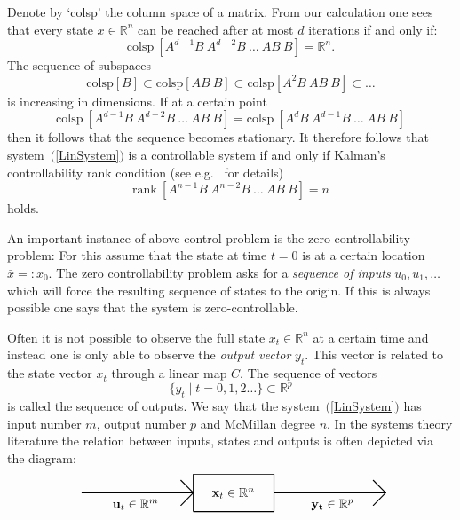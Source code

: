\documentclass[12pt]{report}
\numberwithin{equation}{chapter}
\numberwithin{figure}{chapter}
\newcommand{\R}{\mathbb{R}}
\newcommand{\eqr}[1]{~\mbox{$(${\rm \ref{#1}}$)$}}
\begin{document}
Denote by `colsp' the column space of a matrix. From our
calculation one sees that every state $x\in\R^n$ can be reached
after at most $d$ iterations if and only if:
$$
\mathrm{colsp}\ \left[ A^{d-1}B\ A^{d-2}B\ \ldots \ AB\ 
  B\right]= \R^n.
$$
The sequence of subspaces 
$$
\mathrm{colsp}\left[ B\right]\subset 
\mathrm{colsp}\left[AB\  B\right]\subset
\mathrm{colsp}\left[A^2B\ AB\ B\right]\subset \ldots
$$
is increasing in dimensions. If at a certain point 
$$
\mathrm{colsp}\ \left[ A^{d-1}B\ A^{d-2}B\ \ldots \ AB\ B\right]
=\mathrm{colsp}\ \left[ A^{d}B\ A^{d-1}B\ \ldots \ AB\ B\right]
$$
then it follows that the sequence becomes stationary. 
It therefore follows that system\eqr{LinSystem} is a controllable
system if and only if Kalman's controllability rank
condition (see e.g.~\cite{so90} for details) 
$$
\mathrm{rank}\ \left[ A^{n-1}B\ A^{n-2}B\ \ldots \ AB\ B\right]=
n
$$
holds.


An important instance of above control problem is the zero
controllability problem: For this assume that the state at time
$t=0$ is at a certain location $\bar{x}=:x_0$. The zero
controllability problem asks for a {\em sequence of inputs}
$u_0,u_1,\ldots$  which will force the
resulting sequence of states to the origin. If this is always
possible one says that the system is zero-controllable.

Often it is not possible to observe the full state $x_t\in\R^n$
at a certain time and instead one is only able to observe the
{\em output vector}  $y_t$. This vector
is related to the state vector $x_t$ through a linear map $C$.
The sequence of vectors
$$
\{y_t\mid t=0,1,2\ldots\}\subset \R^p
$$
is called the sequence of outputs. We say that the
system\eqr{LinSystem} has input number $m$, output number $p$ and
McMillan degree \index{McMillan degree} $n$. In the systems
theory literature the relation between inputs, states and outputs
is often depicted via the diagram:
$$
\begin{picture}(240,30)
\thicklines
  \put(  0,15){\line(1, 0){90}}   
 \put( 80,25){\line(1,-1){10}}   
 \put( 80, 5){\line(1, 1){10}}   
 \put( 25, 3){${\mathbf u_t}\in{\mathbb R}^m$}

 \put( 90, 0){\line(1,0){65}} 
 \put( 90,30){\line(1,0){65}}
 \put( 90, 0){\line(0,1){30}}  
 \put(155, 0){\line(0,1){30}}
 \put(105,12){${\mathbf x_t}\in{\mathbb R}^n$}

 \put(155,15){\line(1,0){90}}
 \put(235,25){\line(1,-1){10}}
 \put(235, 5){\line(1, 1){10}}
 \put(185, 3){$\mathbf{y_t}\in{\mathbb R}^p$}
\end{picture}
$$
\end{document}
